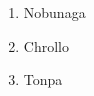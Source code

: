 \documentclass{article}
\begin{document}
	
	\begin{enumerate}
		\item Nobunaga
		\item Chrollo
		\item Tonpa
	\end{enumerate}
\end{document}
